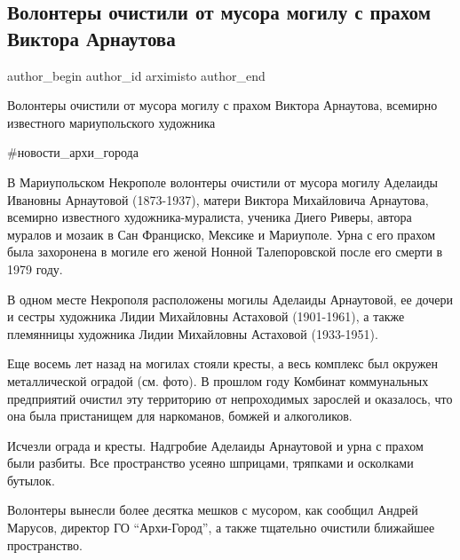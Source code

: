 
 
 
 
 

\subsection{Волонтеры очистили от мусора могилу с прахом Виктора Арнаутова}
\label{sec:27_04_2021.fb.arximisto.1.volontery_ochistka_mogila_viktor_arnautov}

\ifcmt
 author_begin
   author_id arximisto
 author_end
\fi

Волонтеры очистили от мусора могилу с прахом Виктора Арнаутова, всемирно
известного мариупольского художника

\#новости\_архи\_города

В Мариупольском Некрополе волонтеры очистили от мусора могилу Аделаиды Ивановны
Арнаутовой (1873-1937), матери Виктора Михайловича Арнаутова, всемирно
известного художника-муралиста, ученика Диего Риверы, автора муралов и мозаик в
Сан Франциско, Мексике и Мариуполе. Урна с его прахом была захоронена в могиле
его женой Нонной Талепоровской после его смерти в 1979 году.

В одном месте Некрополя расположены могилы Аделаиды Арнаутовой, ее дочери и
сестры художника Лидии Михайловны Астаховой (1901-1961), а также племянницы
художника Лидии Михайловны Астаховой (1933-1951).

Еще восемь лет назад на могилах стояли кресты, а весь комплекс был окружен
металлической оградой (см. фото). В прошлом году Комбинат коммунальных
предприятий очистил эту территорию от непроходимых зарослей и оказалось, что
она была пристанищем для наркоманов, бомжей и алкоголиков.

Исчезли ограда и кресты. Надгробие Аделаиды Арнаутовой и урна с прахом были
разбиты. Все пространство усеяно шприцами, тряпками и осколками бутылок.

Волонтеры вынесли более десятка мешков с мусором, как сообщил Андрей Марусов,
директор ГО \enquote{Архи-Город}, а также тщательно очистили ближайшее пространство.

